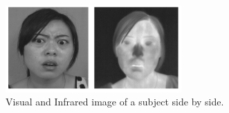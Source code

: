 \begin{figure}[!htb]	\includegraphics[width=0.6\textwidth]{images/infrared.png} 
    \centering

\caption{
Visual and Infrared image of a subject side by side.
} 

\label{fig:infrared}
\end{figure}